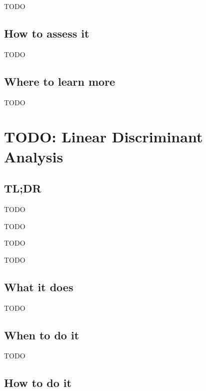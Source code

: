 \documentclass[
]{book}
\providecommand{\tightlist}{%
  \setlength{\itemsep}{0pt}\setlength{\parskip}{0pt}}
\begin{document}
TODO

\hypertarget{how-to-assess-it-3}{%
\section{How to assess it}\label{how-to-assess-it-3}}

TODO

\hypertarget{where-to-learn-more-3}{%
\section{Where to learn more}\label{where-to-learn-more-3}}

TODO

\hypertarget{linear-discriminant-analysis}{%
\chapter{TODO: Linear Discriminant Analysis}\label{linear-discriminant-analysis}}

\hypertarget{tldr-4}{%
\section{TL;DR}\label{tldr-4}}

\begin{description}
\tightlist
\item[What it does]
TODO
\item[When to do it]
TODO
\item[How to do it]
TODO
\item[How to assess it]
TODO
\end{description}

\hypertarget{what-it-does-4}{%
\section{What it does}\label{what-it-does-4}}

TODO

\hypertarget{when-to-do-it-4}{%
\section{When to do it}\label{when-to-do-it-4}}

TODO

\hypertarget{how-to-do-it-4}{%
\section{How to do it}\label{how-to-do-it-4}}
\end{document}
